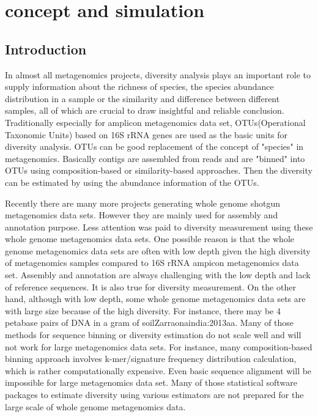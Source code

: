 \documentclass[12pt]{report}
\begin{document}
\tableofcontents


\chapter{concept and simulation}

\section{Introduction}

In almost all  metagenomics projects, diversity analysis plays an important
role to supply information about the richness of species, the species abundance
distribution in a sample or the similarity and difference between different 
samples, all of which are crucial to draw insightful and reliable conclusion. 
Traditionally especially for amplicon metagenomics data set, OTUs(Operational 
Taxonomic Units) based on 16S rRNA genes are used as the basic units for 
diversity analysis. OTUs can be good replacement of the concept of "species" in 
metagenomics. Basically contigs are assembled from reads and are "binned" into
OTUs using composition-based or similarity-based approaches. Then the diversity
can be estimated by using the abundance information of the OTUs.

Recently there are many more projects generating whole genome shotgun metagenomics data sets. However they are 
mainly used for assembly and annotation purpose. Less attention was paid to diversity measurement
using these whole genome metagenomics data sets. One possible reason is that the whole genome metagenomics
data sets are often with low depth given the high diversity of metagenomics samples compared to 16S rRNA
ampicon metagenomics data set. Assembly and annotation are always challenging with the low depth and lack of 
reference sequences. It is also true for diversity measurement. On the other hand, although with low depth, some whole genome metagenomics 
data sets are with large size because of the high diversity. For instance, there may be 4 petabase
pairs of DNA in a gram of soil{Zarraonaindia:2013aa}. Many of those methods for sequence binning or diversity 
estimation do not scale well and will not work for large metagenomics data sets. For instance,
many composition-based binning approach involves k-mer/signature frequency distribution calculation, which is 
rather computationally expensive. Even basic sequence alignment will be impossible for large metagenomics data set.
Many of those statistical software packages to estimate diversity using various estimators are not prepared 
for the large scale of whole genome metagenomics data. 
\end{document}
